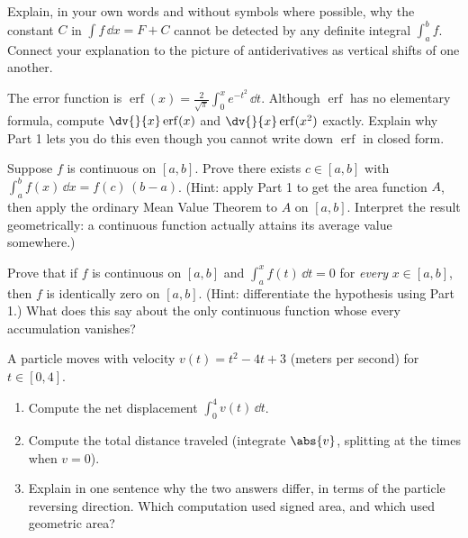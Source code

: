 \begin{exercise}[Conceptual]
Explain, in your own words and without symbols where possible, why the constant
$C$ in $\int f\,\dd x = F+C$ cannot be detected by any definite integral
$\int_a^b f$. Connect your explanation to the picture of antiderivatives as
vertical shifts of one another.
\end{exercise}

\begin{exercise}
The error function is $\operatorname{erf}(x)=\frac{2}{\sqrt{\pi}}\int_0^x
e^{-t^2}\,\dd t$. Although $\operatorname{erf}$ has no elementary formula, compute
$\dv{}{x}\operatorname{erf}(x)$ and $\dv{}{x}\operatorname{erf}(x^2)$ exactly.
Explain why Part 1 lets you do this even though you cannot write down
$\operatorname{erf}$ in closed form.
\end{exercise}

\begin{exercise}
Suppose $f$ is continuous on $[a,b]$. Prove there exists $c\in[a,b]$ with
$\int_a^b f(x)\,\dd x = f(c)\,(b-a)$. (Hint: apply Part 1 to get the area function
$A$, then apply the ordinary Mean Value Theorem to $A$ on $[a,b]$. Interpret the
result geometrically: a continuous function actually attains its average value
somewhere.)
\end{exercise}

\begin{exercise}[Proof]
Prove that if $f$ is continuous on $[a,b]$ and $\int_a^x f(t)\,\dd t = 0$ for
\emph{every} $x\in[a,b]$, then $f$ is identically zero on $[a,b]$. (Hint:
differentiate the hypothesis using Part 1.) What does this say about the only
continuous function whose every accumulation vanishes?
\end{exercise}

\begin{exercise}[Synthesis]
A particle moves with velocity $v(t)=t^2-4t+3$ (meters per second) for
$t\in[0,4]$.
\begin{enumerate}[label=(\alph*)]
  \item Compute the net displacement $\int_0^4 v(t)\,\dd t$.
  \item Compute the total distance traveled (integrate $\abs{v}$, splitting at the
  times when $v=0$).
  \item Explain in one sentence why the two answers differ, in terms of the
  particle reversing direction. Which computation used signed area, and which used
  geometric area?
\end{enumerate}
\end{exercise}
